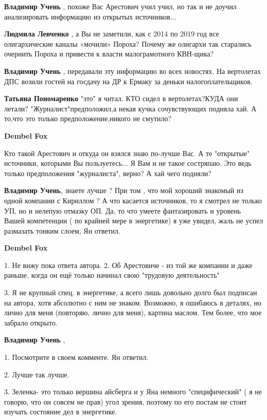 \begin{itemize}
\begin{itemize}
\textbf{Владимир Учень} , похоже Вас Арестович учил учил, но так и не доучил анализировать информацию из открытых источников...

\textbf{Людмила Левченко} , а Вы не заметили, как с 2014 по 2019 год все олигархические каналы «мочили» Пороха? Почему же олигархи так старались очернить Пороха и привести к власти малограмотного КВН-щика?

\textbf{Владимир Учень} , передавали эту информацию во всех новостях. На вертолетах ДПС возили гостей на госдачу на ДР к Ермаку за деньки налогоплательщиков.

\textbf{Татьяна Пономаренко} "это" я читал. КТО сидел в вертолетах?КУДА они летали? "Журналист"предположил,а некая кучка сочувствующих подняла хай. А то,что это только предположение,никого не смутило?

\textbf{Dembel Fox} 

Кто такой Арестович и откуда он взялся знаю по-лучше Вас. А те "открытые"
источники, которыми Вы пользуетесь... Я Вам и не такое состряпаю. Это ведь
только предположения "журналиста", верно? А хай чего подняли?

\textbf{Владимир Учень}, знаете лучше ? При том , что мой хороший знакомый из одной компании с Кириллом ?
А что касается источников, то я смотрел не только УП, но и нелепую отмазку ОП.
Да, то что умеете фантазировать и уровень Вашей компетенции ( по крайней мере в энергетике) я уже увидел, жаль не успел размазать тонким слоем, Ян ответил.

\textbf{Dembel Fox} 

1. Не вижу пока ответа автора.
2. Об Арестовиче - из той же компании и даже раньше, когда он ещё только начинал свою "трудовую деятельность"

3. Я не крупный спец. в энергетике, а всего лишь довольно долго был подписан на
автора, хотя абсолютно с ним не знаком. Возможно, я ошибаюсь в деталях, но лично
для меня (повторяю, лично для меня), картина маслом. Тем более, что мое забрало
открыто.

\textbf{Владимир Учень} ,

1. Посмотрите в своем комменте. Ян ответил.

2. Лучше так лучше.

3. Зеленка- это только вершина айсберга и у Яна немного "специфический" ( я не
говорю, что он совсем не прав) угол зрения, поэтому по его постам не стоит
изучать состояние дел в энергетике.


\end{itemize}
\end{itemize}
